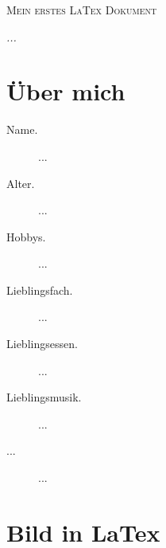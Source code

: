 \documentclass[12pt, a4paper]{article} %
\begin{document}

\thispagestyle{empty}

\begin{title}
	
	\vspace{5cm}
	
	{\scshape\Huge Mein erstes LaTex Dokument \par}

	\vspace{5cm}
	{\Large\itshape ... \par} %
	

\end{title}

\newpage

\tableofcontents %

\newpage

\section{\"Uber mich}

\begin{description}
\item[Name.]
... %
\item[Alter.] 
...
\item[Hobbys.]
...
\item[Lieblingsfach.]
...
\item[Lieblingsessen.]
...
\item[Lieblingsmusik.]
...
\item[...] %
...
\end{description}

\section{Bild in LaTex}


\begin{figure}[h]%
\centering %
\end{figure}
\end{document}
